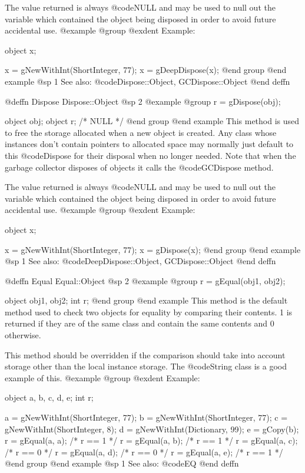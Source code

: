 The value returned is always @code{NULL} and may be used to null out
the variable which contained the object being disposed in order to
avoid future accidental use.
@example
@group
@exdent Example:

object  x;

x = gNewWithInt(ShortInteger, 77);
x = gDeepDispose(x);
@end group
@end example
@sp 1
See also:  @code{Dispose::Object, GCDispose::Object}
@end deffn





@deffn {Dispose} Dispose::Object
@sp 2
@example
@group
r = gDispose(obj);

object  obj;
object  r;     /*  NULL  */
@end group
@end example
This method is used to free the storage allocated when a new object is
created.  Any class whose instances don't contain pointers to allocated
space may normally just default to this @code{Dispose} for their
disposal when no longer needed.  Note that when the garbage collector
disposes of objects it calls the @code{GCDispose} method.

The value returned is always @code{NULL} and may be used to null out
the variable which contained the object being disposed in order to
avoid future accidental use.
@example
@group
@exdent Example:

object  x;

x = gNewWithInt(ShortInteger, 77);
x = gDispose(x);
@end group
@end example
@sp 1
See also:  @code{DeepDispose::Object, GCDispose::Object}
@end deffn











@deffn {Equal} Equal::Object
@sp 2
@example
@group
r = gEqual(obj1, obj2);

object  obj1, obj2;
int     r;
@end group
@end example
This method is the default method used to check two objects for equality
by comparing their contents.  1 is returned if they are of the same
class and contain the same contents and 0 otherwise.

This method should be overridden if the comparison should take
into account storage other than the local instance storage.  The
@code{String} class is a good example of this.
@example
@group
@exdent Example:

object  a, b, c, d, e;
int     r;

a = gNewWithInt(ShortInteger, 77);
b = gNewWithInt(ShortInteger, 77);
c = gNewWithInt(ShortInteger, 8);
d = gNewWithInt(Dictionary, 99);
e = gCopy(b);
r = gEqual(a, a);   /*  r == 1  */
r = gEqual(a, b);   /*  r == 1  */
r = gEqual(a, c);   /*  r == 0  */
r = gEqual(a, d);   /*  r == 0  */
r = gEqual(a, e);   /*  r == 1  */
@end group
@end example
@sp 1
See also:  @code{EQ}
@end deffn











